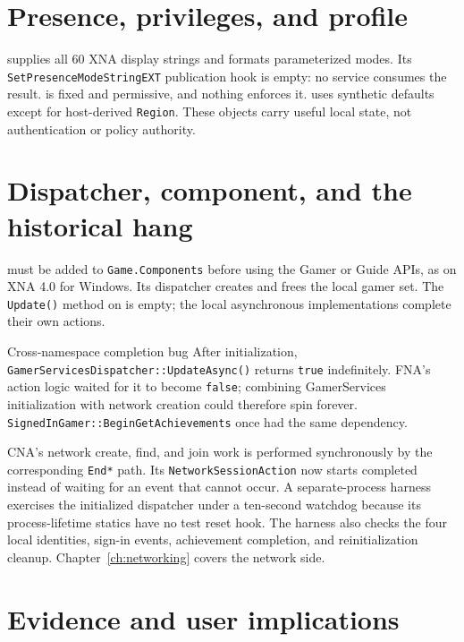 \section{Presence, privileges, and profile}

 supplies all 60 XNA display strings and formats parameterized modes.
Its \texttt{SetPresenceModeStringEXT} publication hook is empty: no service consumes the
result.  is fixed and permissive, and nothing enforces it.
 uses synthetic defaults except for host-derived \texttt{Region}. These
objects carry useful local state, not authentication or policy authority.

\section{Dispatcher, component, and the historical hang}

 must be added to \texttt{Game.Components} before using the
Gamer or Guide APIs, as on XNA 4.0 for Windows. Its dispatcher creates and frees the local
gamer set. The \texttt{Update()} method on  is empty; the local asynchronous
implementations complete their own actions.

\label{sec:gamerservices-hang}
\begin{historynote}{Cross-namespace completion bug}
After initialization, \texttt{GamerServicesDispatcher::}\allowbreak\texttt{UpdateAsync()}
returns \texttt{true}
indefinitely. FNA's  action logic waited for it to become
\texttt{false}; combining GamerServices initialization with network creation could therefore
spin forever. \texttt{SignedInGamer::BeginGetAchievements} once had the same dependency.

CNA's network create, find, and join work is performed synchronously by the corresponding
\texttt{End*} path. Its \texttt{NetworkSessionAction} now starts completed instead of waiting
for an event that cannot occur. A separate-process harness exercises the initialized dispatcher
under a ten-second watchdog because its process-lifetime statics have no test reset hook. The
harness also checks the four local identities, sign-in events, achievement completion, and
reinitialization cleanup. Chapter~\ref{ch:networking} covers the network side.
\end{historynote}

\section{Evidence and user implications}

